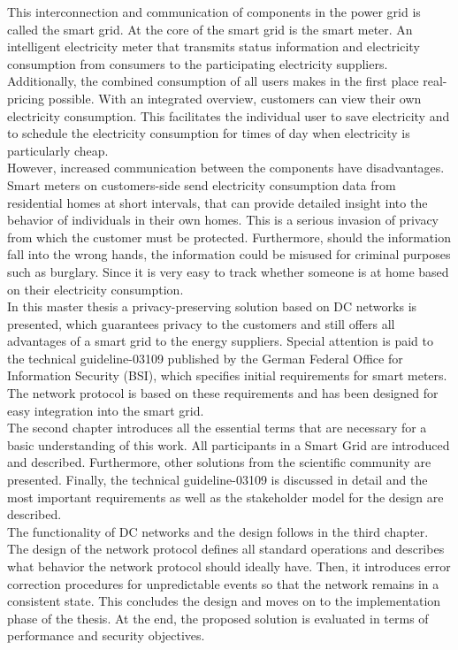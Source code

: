 This interconnection and communication of components in the power grid is called the smart grid. At the core of the smart grid is the smart meter. An intelligent electricity meter that transmits status information and electricity consumption from consumers to the participating electricity suppliers. Additionally, the combined consumption of all users makes in the first place real-pricing possible. With an integrated overview, customers can view their own electricity consumption. This facilitates the individual user to save electricity and to schedule the electricity consumption for times of day when electricity is particularly cheap.\\ However, increased communication between the components have disadvantages. Smart meters on customers-side send electricity consumption data from residential homes at short intervals, that can provide detailed insight into the behavior of individuals in their own homes. This is a serious invasion of privacy from which the customer must be protected. Furthermore, should the information fall into the wrong hands, the information could be misused for criminal purposes such as burglary. Since it is very easy to track whether someone is at home based on their electricity consumption.\\ In this master thesis a privacy-preserving solution based on DC networks is presented, which guarantees privacy to the customers and still offers all advantages of a smart grid to the energy suppliers. Special attention is paid to the technical guideline-03109 published by the German Federal Office for Information Security (BSI), which specifies initial requirements for smart meters. The network protocol is based on these requirements and has been designed for easy integration into the smart grid.\\ The second chapter introduces all the essential terms that are necessary for a basic understanding of this work. All participants in a Smart Grid are introduced and described. Furthermore, other solutions from the scientific community are presented. Finally, the technical guideline-03109 is discussed in detail and the most important requirements as well as the stakeholder model for the design are described.\\ The functionality of DC networks and the design follows in the third chapter. The design of the network protocol defines all standard operations and describes what behavior the network protocol should ideally have. Then, it introduces error correction procedures for unpredictable events so that the network remains in a consistent state. This concludes the design and moves on to the implementation phase of the thesis. At the end, the proposed solution is evaluated in terms of performance and security objectives.\\
